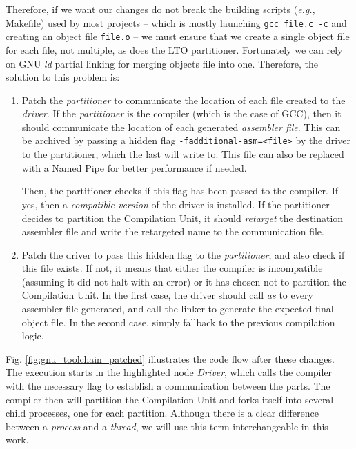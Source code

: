 \documentclass[runningheads]{llncs}
\begin{document}
Therefore, if we want our changes do not break the building scripts
(\textit{e.g.}, Makefile) used by most
projects -- which is mostly launching \texttt{gcc file.c -c} and creating an object file \texttt{file.o} -- we must ensure that we create a single object file for each file,
not multiple, as does the LTO partitioner. Fortunately we can rely on GNU \textit{ld}
partial linking for merging objects file into one. Therefore, the solution to this problem
is:
\begin{enumerate}
	\item Patch the \textit{partitioner} to communicate the location of
	each file created to the \textit{driver}. If the \textit{partitioner}
	is the compiler (which is the case of GCC), then it should communicate
	the location of each generated \textit{assembler file}. This can be
	archived by passing a hidden flag \texttt{-fadditional-asm=<file>}
	by the driver to the partitioner, which the last will write to. This file can also
	be replaced with a Named Pipe for better performance if needed.

	Then, the partitioner checks if this flag has been passed to the compiler. If yes, then
	a \textit{compatible version} of the driver is installed. If the
	partitioner decides to partition the Compilation Unit, it should
	\textit{retarget} the destination assembler file and write the retargeted
	name to the communication file.

	\item Patch the driver to pass this hidden flag to the
	\textit{partitioner}, and also check if this file exists. If not, it means that
	either the compiler is incompatible (assuming it did not halt with an
	error) or it has chosen not to partition the Compilation Unit. In the first
	case, the driver should call \textit{as} to every assembler file generated, and call
	the linker to generate the expected final object file. In the second case,
	simply fallback to the previous compilation logic.
\end{enumerate}

Fig. \ref{fig:gnu_toolchain_patched} illustrates the code flow after these
changes.  The execution starts in the highlighted node \textit{Driver}, which
calls the compiler with the necessary flag to establish a communication between
the parts. The compiler then will partition the Compilation Unit and forks
itself into several child processes, one for each partition. Although there is
a clear difference between a \textit{process} and a \textit{thread}, we will
use this term interchangeable in this work.
\end{document}
